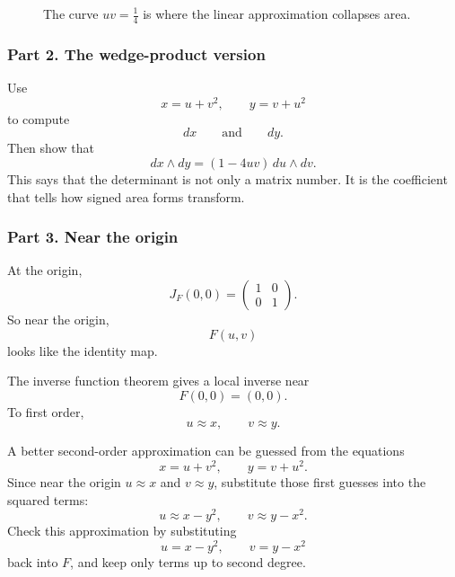 \begin{figure}[h]
\centering
{}
\caption{The curve \(uv=\frac14\) is where the linear approximation collapses area.}
\end{figure}

\subsubsection*{Part 2. The wedge-product version}

Use
\[
    x=u+v^2,
    \qquad
    y=v+u^2
\]
to compute
\[
    dx
    \qquad\text{and}\qquad
    dy.
\]
Then show that
\[
\boxed{
    dx\wedge dy=(1-4uv)\,du\wedge dv.
}
\]
This says that the determinant is not only a matrix number.  It is the coefficient that
tells how signed area forms transform.

\subsubsection*{Part 3. Near the origin}

At the origin,
\[
    J_F(0,0)=
    \begin{pmatrix}
        1 & 0\\
        0 & 1
    \end{pmatrix}.
\]
So near the origin,
\[
    F(u,v)
\]
looks like the identity map.

The inverse function theorem gives a local inverse near
\[
    F(0,0)=(0,0).
\]
To first order,
\[
    u\approx x,
    \qquad
    v\approx y.
\]

A better second-order approximation can be guessed from the equations
\[
    x=u+v^2,
    \qquad
    y=v+u^2.
\]
Since near the origin \(u\approx x\) and \(v\approx y\), substitute those first guesses
into the squared terms:
\[
    u\approx x-y^2,
    \qquad
    v\approx y-x^2.
\]
Check this approximation by substituting
\[
    u=x-y^2,
    \qquad
    v=y-x^2
\]
back into \(F\), and keep only terms up to second degree.

